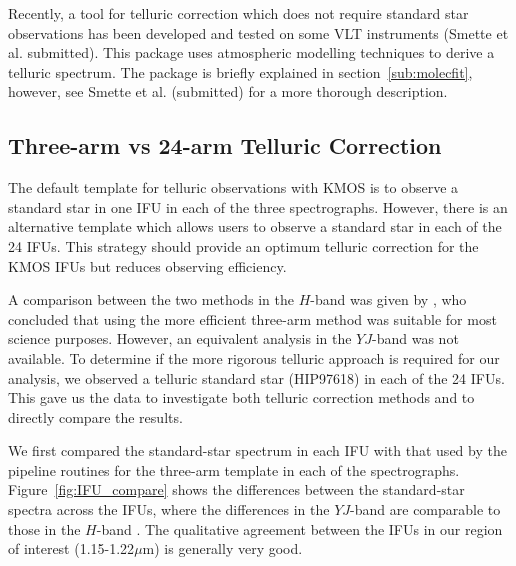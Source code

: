 Recently, a tool for telluric correction which does not require standard star observations has been developed and tested on some VLT instruments
(Smette et al. submitted).
This package uses atmospheric modelling techniques to derive a telluric spectrum.
The package is briefly explained in section~\ref{sub:molecfit},
however, see Smette et al. (submitted) for a more thorough description.



\subsection{Three-arm vs 24-arm Telluric Correction} %
\label{sub:three_arm_vs_24_arm_telluric_correction}

The default template for telluric observations with KMOS is to observe a standard star in one IFU in each of the three spectrographs.
However, there is an alternative template which allows users to observe a standard star in each of the 24 IFUs.
This strategy should provide an optimum telluric correction for the KMOS IFUs but reduces observing efficiency.

A comparison between the two methods in the $H$-band was given by
\cite{2013A&A...558A..56D},
who concluded that using the more efficient three-arm method was suitable for most science purposes.
However, an equivalent analysis in the $YJ$-band was not available.
To determine if the more rigorous telluric approach is required for our analysis,
we observed a telluric standard star (HIP97618) in each of the 24 IFUs.
This gave us the data to investigate both telluric correction methods and to directly compare the results.

We first compared the standard-star spectrum in each IFU with that used by the pipeline routines for the three-arm template in each of the spectrographs.
Figure~\ref{fig:IFU_compare} shows the differences between the standard-star spectra across the IFUs,
where the differences in the $YJ$-band are comparable to those in the $H$-band
\cite[cf. Fig.7 from][]{2013A&A...558A..56D}.
The qualitative agreement between the IFUs in our region of interest (1.15-1.22$\mu$m) is generally very good.


